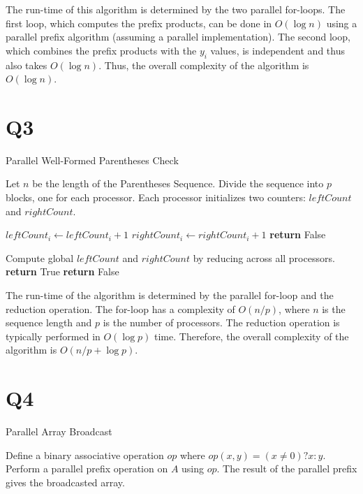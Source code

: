\documentclass{article}
\begin{document}
The run-time of this algorithm is determined by the two parallel for-loops. The first loop, which computes the prefix products, can be done in $O(\log n)$ using a parallel prefix algorithm (assuming a parallel implementation). The second loop, which combines the prefix products with the $y_i$ values, is independent and thus also takes $O(\log n)$. Thus, the overall complexity of the algorithm is $O(\log n)$.

\section{Q3}
\begin{algorithm}
\caption{Parallel Well-Formed Parentheses Check}
\begin{algorithmic}[1]
    \State Let $n$ be the length of the Parentheses Sequence.
    \State Divide the sequence into $p$ blocks, one for each processor.
    \State Each processor initializes two counters: $leftCount$ and $rightCount$.
    
                \State $leftCount_i \gets leftCount_i + 1$
                \State $rightCount_i \gets rightCount_i + 1$
                    \State \textbf{return} False 
                \EndIf
            \EndIf
        \EndFor
    \EndFor
    
    \State Compute global $leftCount$ and $rightCount$ by reducing across all processors.
        \State \textbf{return} True
    \Else
        \State \textbf{return} False
    \EndIf
\EndFunction
\end{algorithmic}
\end{algorithm}

The run-time of the algorithm is determined by the parallel for-loop and the reduction operation. The for-loop has a complexity of $O(n/p)$, where $n$ is the sequence length and $p$ is the number of processors. The reduction operation is typically performed in $O(\log p)$ time. Therefore, the overall complexity of the algorithm is $O(n/p + \log p)$.
\section{Q4}
\begin{algorithm}
\caption{Parallel Array Broadcast}
\begin{algorithmic}[1]
    \State Define a binary associative operation \( op \) where \( op(x, y) = (x \neq 0) ? x : y \).
    \State Perform a parallel prefix operation on \( A \) using \( op \).
    \State The result of the parallel prefix gives the broadcasted array.
\EndFunction
\end{algorithmic}
\end{algorithm}
\end{document}
